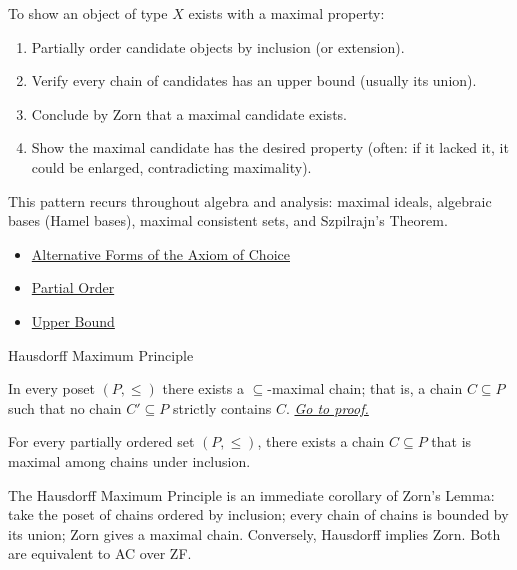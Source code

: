 \begin{remark*}[Exposition]
To show an object of type $X$ exists with a maximal property:
\begin{enumerate}
  \item Partially order candidate objects by inclusion (or extension).
  \item Verify every chain of candidates has an upper bound (usually its union).
  \item Conclude by Zorn that a maximal candidate exists.
  \item Show the maximal candidate has the desired property (often: if it
        lacked it, it could be enlarged, contradicting maximality).
\end{enumerate}
This pattern recurs throughout algebra and analysis: maximal ideals,
algebraic bases (Hamel bases), maximal consistent sets, and Szpilrajn's Theorem.
\end{remark*}

\begin{dependencies}
\begin{itemize}
  \item \hyperref[thm:ac-alternative-forms]{Alternative Forms of the Axiom of Choice}
  \item \hyperref[def:partial-order]{Partial Order}
  \item \hyperref[def:upper-bound]{Upper Bound}
\end{itemize}
\end{dependencies}

\begin{theorembox}{Hausdorff Maximum Principle}
\begin{theorem}
\label{thm:hausdorff}
In every poset $(P, \leq)$ there exists a $\subseteq$-maximal chain; that
is, a chain $C \subseteq P$ such that no chain $C' \subseteq P$ strictly
contains $C$.
\hyperref[prf:hausdorff]{\textit{Go to proof.}}
\end{theorem}
\end{theorembox}

\begin{remark*}
For every partially ordered set $(P,\leq)$, there exists a chain
$C\subseteq P$ that is maximal among chains under inclusion.
\end{remark*}

\begin{remark*}[Interpretation]
The Hausdorff Maximum Principle is an immediate corollary of Zorn's Lemma:
take the poset of chains ordered by inclusion; every chain of chains is
bounded by its union; Zorn gives a maximal chain. Conversely, Hausdorff
implies Zorn. Both are equivalent to AC over ZF.
\end{remark*}

